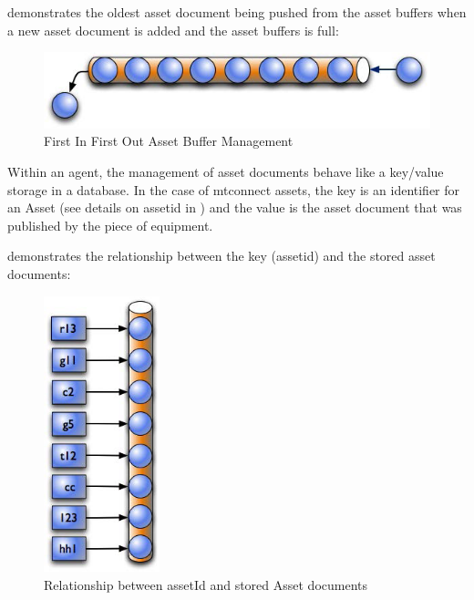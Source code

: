 \documentclass{mtconnect}	%
\begin{document}
 demonstrates the oldest \gls{asset document} being pushed from the \glspl{asset buffer} when a new \gls{asset document} is added and the \glspl{asset buffer} is full:

\begin{figure}[ht]
  \centering
  \includegraphics[width=1.0\textwidth]{figures/first-in-first-out-asset-buffer-management.png}
  \caption{First In First Out Asset Buffer Management}
  \label{fig:first-in-first-out-asset-buffer-management}
\end{figure}

\FloatBarrier

Within an \gls{agent}, the management of \glspl{asset document} behave like a key/value storage in a database.  In the case of \glspl{mtconnect asset}, the key is an identifier for an Asset (see details on \gls{assetid} in ) and the value is the \gls{asset document} that was published by the piece of equipment. 

 demonstrates the relationship between the key (\gls{assetid}) and the stored \glspl{asset document}:

\begin{figure}[ht]
  \centering
  \includegraphics[width=0.3\textwidth]{figures/relationship-between-assetid-and-stored-asset-documents.png}
  \caption{Relationship between assetId and stored Asset documents}
  \label{fig:relationship-between-assetid-and-stored-asset-documents}
\end{figure}
\end{document}

